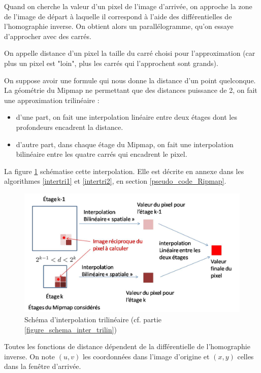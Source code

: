 Quand on cherche la valeur d'un pixel de l'image d'arrivée, on approche la zone de l'image de départ à laquelle il correspond à l'aide des différentielles de l'homographie inverse. On obtient alors un parallélogramme, qu'on essaye d'approcher avec des carrés. 


On appelle distance d'un pixel la taille du carré choisi pour l'approximation (car plus un pixel est "loin", plus les carrés qui l'approchent sont grands). 

On suppose avoir une formule qui nous donne la distance d'un point quelconque. La géométrie du Mipmap ne permettant que des distances puissance de 2, on fait une approximation trilinéaire : 

\begin{itemize}
  \item d'une part, on fait une interpolation linéaire entre deux étages dont les profondeurs encadrent la distance.
  \item d'autre part, dans chaque étage du Mipmap, on fait une interpolation bilinéaire entre les quatre carrés qui encadrent le pixel.
\end{itemize}

La figure \ref{intertrilineaire} schématise cette interpolation. Elle est décrite en annexe dans les algorithmes \ref{intertri1} et \ref{intertri2}, en section \ref{pseudo_code_Ripmap}.
\label{figure_schema_inter_trilin}
\begin{figure}[h!]
\centering
\includegraphics[scale=0.5]{intertrilineaire.jpg}
\caption{Schéma d'interpolation trilinéaire (cf. partie \ref{figure_schema_inter_trilin})}
\label{intertrilineaire}
\end{figure}


\label{fonctiondistance}
Toutes les fonctions de distance dépendent de la différentielle de l'homographie inverse.
On note $(u,v)$ les coordonnées dans l'image d'origine et $(x,y)$ celles dans la fenêtre d'arrivée.

